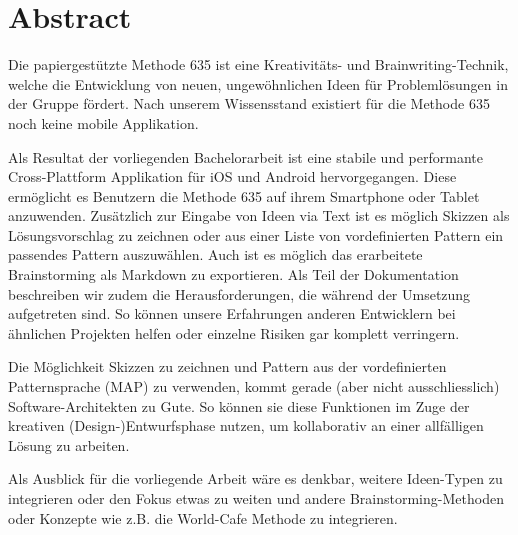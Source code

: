 \thispagestyle{empty}
\section*{Abstract}

Die papiergestützte Methode 635 ist eine Kreativitäts- und Brainwriting-Technik, welche die Entwicklung von neuen, ungewöhnlichen Ideen für Problemlösungen in der Gruppe fördert. Nach unserem Wissensstand existiert für die Methode 635 noch keine mobile Applikation. 

Als Resultat der vorliegenden Bachelorarbeit ist eine stabile und performante Cross-Plattform Applikation für iOS und Android hervorgegangen. Diese ermöglicht es Benutzern die Methode 635 auf ihrem Smartphone oder Tablet anzuwenden. Zusätzlich zur Eingabe von Ideen via Text ist es möglich Skizzen als Lösungsvorschlag zu zeichnen oder aus einer Liste von vordefinierten Pattern ein passendes Pattern auszuwählen. Auch ist es möglich das erarbeitete Brainstorming als Markdown zu exportieren. Als Teil der Dokumentation beschreiben wir zudem die Herausforderungen, die während der Umsetzung aufgetreten sind. So können unsere Erfahrungen anderen Entwicklern bei ähnlichen Projekten helfen oder einzelne Risiken gar komplett verringern.

Die Möglichkeit Skizzen zu zeichnen und Pattern aus der vordefinierten Patternsprache (MAP) zu verwenden, kommt gerade (aber nicht ausschliesslich) Software-Architekten zu Gute. So können sie diese Funktionen im Zuge der kreativen (Design-)Entwurfsphase nutzen, um kollaborativ an einer allfälligen Lösung zu arbeiten.

Als Ausblick für die vorliegende Arbeit wäre es denkbar, weitere Ideen-Typen zu integrieren oder den Fokus etwas zu weiten und andere Brainstorming-Methoden oder Konzepte wie z.B. die World-Cafe Methode zu integrieren. 


